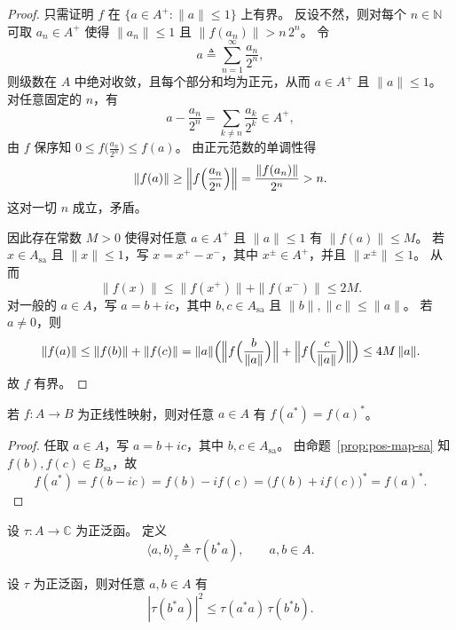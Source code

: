 \documentclass[lang=cn,a4paper,newtx,section]{elegantbook}
\begin{document}
\begin{proof}
  只需证明 $f$ 在 $\{a\in A^{+}:\|a\|\le 1\}$ 上有界。
  反设不然，则对每个 $n\in\mathbb{N}$ 可取 $a_{n}\in A^{+}$ 使得 $\|a_{n}\|\le 1$ 且 $\|f(a_{n})\|>n\,2^{n}$。
  令
  \[
    a\triangleq\sum_{n=1}^{\infty}\frac{a_{n}}{2^{n}},
  \]
  则级数在 $A$ 中绝对收敛，且每个部分和均为正元，从而 $a\in A^{+}$ 且 $\|a\|\le 1$。
  对任意固定的 $n$，有
  \[
    a-\frac{a_{n}}{2^{n}}=\sum_{k\ne n}\frac{a_{k}}{2^{k}}\in A^{+},
  \]
  由 $f$ 保序知 $0\le f\bigl(\frac{a_{n}}{2^{n}}\bigr)\le f(a)$。
  由正元范数的单调性得
  \[
    \|f(a)\|\ge\Bigl\|f\Bigl(\frac{a_{n}}{2^{n}}\Bigr)\Bigr\|=\frac{\|f(a_{n})\|}{2^{n}}>n.
  \]
  这对一切 $n$ 成立，矛盾。

  因此存在常数 $M>0$ 使得对任意 $a\in A^{+}$ 且 $\|a\|\le 1$ 有 $\|f(a)\|\le M$。
  若 $x\in A_{\mathrm{sa}}$ 且 $\|x\|\le 1$，写 $x=x^{+}-x^{-}$，其中 $x^{\pm}\in A^{+}$，并且 $\|x^{\pm}\|\le 1$。
  从而
  \[
    \|f(x)\|\le \|f(x^{+})\|+\|f(x^{-})\|\le 2M.
  \]
  对一般的 $a\in A$，写 $a=b+ic$，其中 $b,c\in A_{\mathrm{sa}}$ 且 $\|b\|,\|c\|\le\|a\|$。
  若 $a\ne 0$，则
  \[
    \|f(a)\|\le \|f(b)\|+\|f(c)\|=\|a\|\Bigl(\Bigl\|f\Bigl(\frac{b}{\|a\|}\Bigr)\Bigr\|+\Bigl\|f\Bigl(\frac{c}{\|a\|}\Bigr)\Bigr\|\Bigr)\le 4M\,\|a\|.
  \]
  故 $f$ 有界。
\end{proof}

\begin{proposition}\label{prop:pos-map-star}
  若 $f:A\to B$ 为正线性映射，则对任意 $a\in A$ 有 $f(a^{*})=f(a)^{*}$。
\end{proposition}

\begin{proof}
  任取 $a\in A$，写 $a=b+ic$，其中 $b,c\in A_{\mathrm{sa}}$。
  由命题~\ref{prop:pos-map-sa} 知 $f(b),f(c)\in B_{\mathrm{sa}}$，故
  \[
    f(a^{*})=f(b-ic)=f(b)-if(c)=\bigl(f(b)+if(c)\bigr)^{*}=f(a)^{*}.
  \]
\end{proof}

\begin{definition}
  设 $\tau:A\to\mathbb{C}$ 为正泛函。
  定义
  \[
    \langle a,b\rangle_{\tau}\triangleq\tau(b^{*}a),\qquad a,b\in A.
  \]
\end{definition}

\begin{proposition}
  设 $\tau$ 为正泛函，则对任意 $a,b\in A$ 有
  \[
    |\tau(b^{*}a)|^{2}\le \tau(a^{*}a)\,\tau(b^{*}b).
  \]
\end{proposition}
\end{document}

